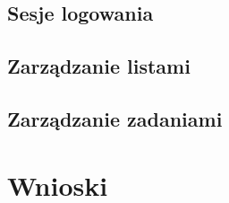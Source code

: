 \documentclass[eng,printmode]{02_class}
\begin{document}
    \section{Sesje logowania}
    \label{section:sessions}
    

    \section{Zarządzanie listami}
    \label{section:lists}
    

    \section{Zarządzanie zadaniami}
    \label{section:tasks}
    

  \chapter{Wnioski}
  \label{chapter:conclusions}
  

  \begin{thebibliography}{plain}
    \label{bibliography}
    
  \end{thebibliography}
\end{document}
